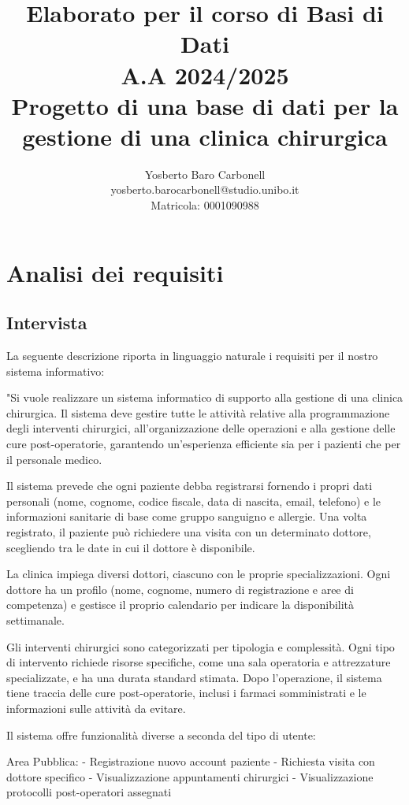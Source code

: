 \documentclass[12pt,a4paper]{report}
\title{{\Huge Elaborato per il corso di Basi di Dati}\\[1cm]
       {\Large A.A 2024/2025}\\[1cm]
       {\Large Progetto di una base di dati per la gestione di una clinica chirurgica}}
\author{Yosberto Baro Carbonell\\[0.5cm]
        yosberto.barocarbonell@studio.unibo.it\\
        Matricola: 0001090988
        }
\date{}
\begin{document}
\maketitle

\tableofcontents

\chapter{Analisi dei requisiti}

\section{Intervista}
La seguente descrizione riporta in linguaggio naturale i requisiti per il nostro sistema informativo:

"Si vuole realizzare un sistema informatico di supporto alla gestione di una clinica chirurgica. Il sistema deve gestire tutte le attività relative alla programmazione degli interventi chirurgici, all'organizzazione delle operazioni e alla gestione delle cure post-operatorie, garantendo un'esperienza efficiente sia per i pazienti che per il personale medico.

Il sistema prevede che ogni paziente debba registrarsi fornendo i propri dati personali (nome, cognome, codice fiscale, data di nascita, email, telefono) e le informazioni sanitarie di base come gruppo sanguigno e allergie. Una volta registrato, il paziente può richiedere una visita con un determinato dottore, scegliendo tra le date in cui il dottore è disponibile.

La clinica impiega diversi dottori, ciascuno con le proprie specializzazioni. Ogni dottore ha un profilo (nome, cognome, numero di registrazione e aree di competenza) e gestisce il proprio calendario per indicare la disponibilità settimanale.

Gli interventi chirurgici sono categorizzati per tipologia e complessità. Ogni tipo di intervento richiede risorse specifiche, come una sala operatoria e attrezzature specializzate, e ha una durata standard stimata. Dopo l'operazione, il sistema tiene traccia delle cure post-operatorie, inclusi i farmaci somministrati e le informazioni sulle attività da evitare.

Il sistema offre funzionalità diverse a seconda del tipo di utente:

Area Pubblica:
- Registrazione nuovo account paziente
- Richiesta visita con dottore specifico
- Visualizzazione appuntamenti chirurgici
- Visualizzazione protocolli post-operatori assegnati
\end{document}
